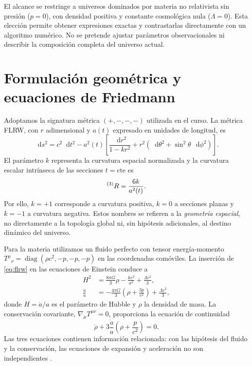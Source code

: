 \documentclass[letterpaper,11pt]{article}
\newcommand{\Rthree}{\prescript{(3)}{}{R}}
\newcommand{\dd}{\mathop{}\!\mathrm{d}}
\begin{document}
El alcance se restringe a universos dominados por materia no relativista sin presión ($p=0$), con densidad positiva y constante cosmológica nula ($\Lambda=0$). Esta elección permite obtener expresiones exactas y contrastarlas directamente con un algoritmo numérico. No se pretende ajustar parámetros observacionales ni describir la composición completa del universo actual.

\section{Formulación geométrica y ecuaciones de Friedmann}

Adoptamos la signatura métrica $(+,-,-,-)$ utilizada en el curso. La métrica FLRW, con $r$ adimensional y $a(t)$ expresado en unidades de longitud, es
\begin{equation}
\boxed{\dd s^2=c^2\dd t^2-a^2(t)\left[\frac{\dd r^2}{1-kr^2}+r^2(\dd\theta^2+\sin^2\theta\,\dd\phi^2)\right].}
\label{eq:flrw}
\end{equation}
El parámetro $k$ representa la curvatura espacial normalizada y la curvatura escalar intrínseca de las secciones $t=\mathrm{cte}$ es
\begin{equation}
\Rthree=\frac{6k}{a^2(t)}.
\label{eq:3curv}
\end{equation}
Por ello, $k=+1$ corresponde a curvatura positiva, $k=0$ a secciones planas y $k=-1$ a curvatura negativa. Estos nombres se refieren a la \emph{geometría espacial}, no directamente a la topología global ni, sin hipótesis adicionales, al destino dinámico del universo.

Para la materia utilizamos un fluido perfecto con tensor energía-momento $T^\mu{}_\nu=\operatorname{diag}(\rho c^2,-p,-p,-p)$ en las coordenadas comóviles. La inserción de \eqref{eq:flrw} en las ecuaciones de Einstein conduce a
\begin{align}
H^2&=\frac{8\pi G}{3}\rho-\frac{kc^2}{a^2}+\frac{\Lambda c^2}{3}, \label{eq:friedmann1}\\
\frac{\ddot a}{a}&=-\frac{4\pi G}{3}\left(\rho+\frac{3p}{c^2}\right)+\frac{\Lambda c^2}{3},\label{eq:friedmann2}
\end{align}
donde $H=\dot a/a$ es el parámetro de Hubble y $\rho$ la densidad de masa. La conservación covariante, $\nabla_\mu T^{\mu\nu}=0$, proporciona la ecuación de continuidad
\begin{equation}
\dot\rho+3\frac{\dot a}{a}\left(\rho+\frac{p}{c^2}\right)=0.
\label{eq:continuidad}
\end{equation}
Las tres ecuaciones contienen información relacionada: con las hipótesis del fluido y la conservación, las ecuaciones de expansión y aceleración no son independientes \cite{janssen2013,carroll2004}.
\end{document}
